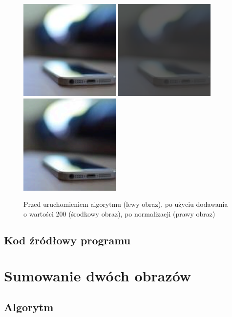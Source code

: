 \documentclass[a4paper,12pt]{book}
\begin{document}
\begin{figure}[H]
\caption{Przed uruchomieniem algorytmu (lewy obraz), po użyciu dodawania o wartości 200 (środkowy obraz), po normalizacji (prawy obraz)}
\includegraphics[width=5cm, height=5cm]{phone-unmodified.jpg}
\includegraphics[width=5cm, height=5cm]{3-1/sum-color-const-phone-200.png}
\includegraphics[width=5cm, height=5cm]{3-1/sum-color-const-phone-200-norm.png}
\end{figure}

\subsection*{Kod źródłowy programu}

\section{Sumowanie dwóch obrazów}
\subsection*{Algorytm}
\end{document}
